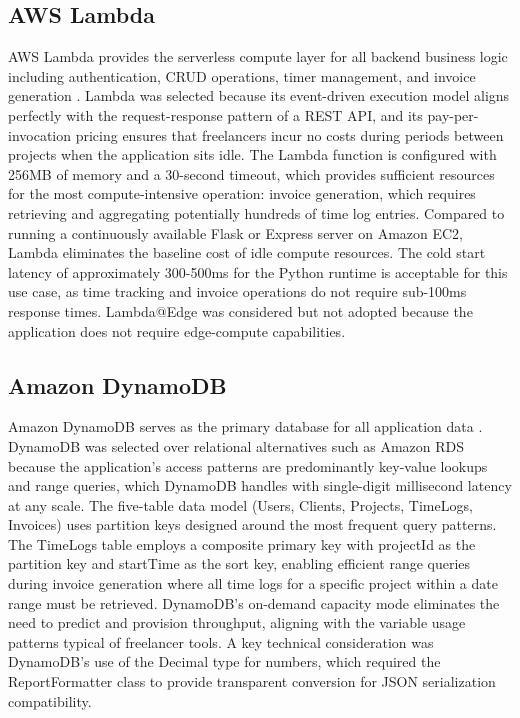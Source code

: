 \documentclass[conference]{IEEEtran}
\begin{document}
\subsection{AWS Lambda}

AWS Lambda provides the serverless compute layer for all backend business logic including authentication, CRUD operations, timer management, and invoice generation \cite{awslambda}. Lambda was selected because its event-driven execution model aligns perfectly with the request-response pattern of a REST API, and its pay-per-invocation pricing ensures that freelancers incur no costs during periods between projects when the application sits idle. The Lambda function is configured with 256MB of memory and a 30-second timeout, which provides sufficient resources for the most compute-intensive operation: invoice generation, which requires retrieving and aggregating potentially hundreds of time log entries. Compared to running a continuously available Flask or Express server on Amazon EC2, Lambda eliminates the baseline cost of idle compute resources. The cold start latency of approximately 300-500ms for the Python runtime is acceptable for this use case, as time tracking and invoice operations do not require sub-100ms response times. Lambda@Edge was considered but not adopted because the application does not require edge-compute capabilities.

\subsection{Amazon DynamoDB}

Amazon DynamoDB serves as the primary database for all application data \cite{awsdynamodb}. DynamoDB was selected over relational alternatives such as Amazon RDS because the application's access patterns are predominantly key-value lookups and range queries, which DynamoDB handles with single-digit millisecond latency at any scale. The five-table data model (Users, Clients, Projects, TimeLogs, Invoices) uses partition keys designed around the most frequent query patterns. The TimeLogs table employs a composite primary key with projectId as the partition key and startTime as the sort key, enabling efficient range queries during invoice generation where all time logs for a specific project within a date range must be retrieved. DynamoDB's on-demand capacity mode eliminates the need to predict and provision throughput, aligning with the variable usage patterns typical of freelancer tools. A key technical consideration was DynamoDB's use of the Decimal type for numbers, which required the ReportFormatter class to provide transparent conversion for JSON serialization compatibility.
\end{document}
